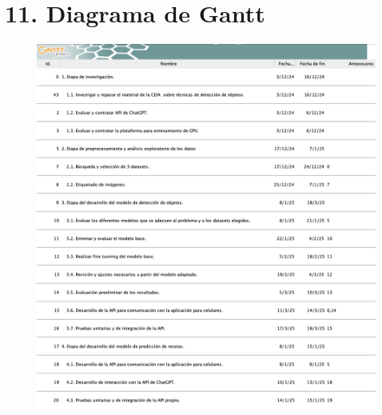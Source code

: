 \documentclass[
11pt, %
]{charter}
\begin{document}
\section{11. Diagrama de Gantt}
\label{sec:gantt}

\begin{figure}[H]
\centering 
\includegraphics[width=1\textwidth]{./GanttActividades1.png}
\label{fig:AoN}
\end{figure}
\end{document}
